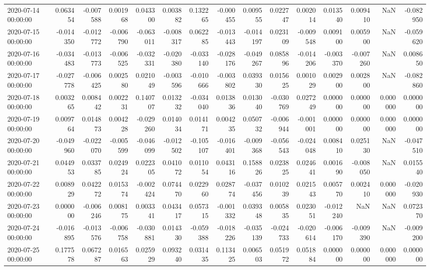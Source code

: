 \begin{tabular}{lrrrrrrrrrrrrrr}
2020-07-14 00:00:00 & 0.063454 & -0.007588 & 0.001968 & 0.043300 & 0.003882 & 0.132265 & -0.000455 & 0.009555 & 0.022747 & 0.002014 & 0.013540 & 0.009410 & NaN & -0.082950 \\
2020-07-15 00:00:00 & -0.014350 & -0.012772 & -0.006790 & -0.063011 & -0.008317 & 0.062285 & -0.013443 & -0.014197 & 0.023109 & -0.009548 & 0.009100 & 0.005900 & NaN & -0.059620 \\
2020-07-16 00:00:00 & -0.034483 & -0.013773 & -0.006525 & -0.032331 & -0.020380 & -0.033140 & -0.028176 & -0.049267 & 0.085896 & -0.014206 & -0.003370 & -0.007260 & NaN & 0.008650 \\
2020-07-17 00:00:00 & -0.027778 & -0.006425 & 0.002580 & 0.021049 & -0.003596 & -0.010666 & -0.003802 & 0.039330 & 0.015625 & 0.001029 & 0.002900 & 0.002800 & NaN & -0.082860 \\
2020-07-18 00:00:00 & 0.003265 & 0.008442 & 0.002231 & 0.140707 & 0.013232 & -0.034040 & 0.013836 & 0.013040 & -0.030769 & 0.027249 & 0.000000 & 0.000000 & 0.000000 & 0.000000 \\
2020-07-19 00:00:00 & 0.009764 & 0.014873 & 0.004228 & -0.029260 & 0.014034 & 0.014171 & 0.004235 & 0.050732 & -0.006944 & -0.001001 & 0.000000 & 0.000000 & 0.000000 & 0.000000 \\
2020-07-20 00:00:00 & -0.049960 & -0.022070 & -0.005599 & -0.046099 & -0.012502 & -0.105107 & -0.016401 & -0.009368 & -0.056543 & -0.024048 & 0.008410 & 0.025130 & NaN & -0.047510 \\
2020-07-21 00:00:00 & 0.044953 & 0.033785 & 0.024924 & 0.022305 & 0.041072 & 0.011054 & 0.043116 & 0.158826 & 0.023825 & 0.024641 & 0.001690 & -0.008050 & NaN & 0.015540 \\
2020-07-22 00:00:00 & 0.008929 & 0.042272 & 0.015374 & -0.002424 & 0.074470 & 0.022960 & 0.028774 & -0.037456 & 0.010239 & 0.021543 & 0.005770 & 0.002410 & 0.000000 & -0.020930 \\
2020-07-23 00:00:00 & 0.000000 & -0.006246 & 0.008175 & 0.003341 & 0.043417 & 0.057315 & -0.001332 & 0.039348 & 0.005835 & 0.023051 & -0.012240 & NaN & NaN & 0.072370 \\
2020-07-24 00:00:00 & -0.016895 & -0.013576 & -0.006758 & -0.030881 & 0.014330 & -0.059388 & -0.018226 & -0.035139 & -0.024733 & -0.020614 & -0.006170 & -0.009390 & NaN & -0.009200 \\
2020-07-25 00:00:00 & 0.177578 & 0.067287 & 0.016563 & 0.025929 & 0.093240 & 0.031435 & 0.113425 & 0.006503 & 0.051972 & 0.051884 & 0.000000 & 0.000000 & 0.000000 & 0.000000 \\

\end{tabular}
